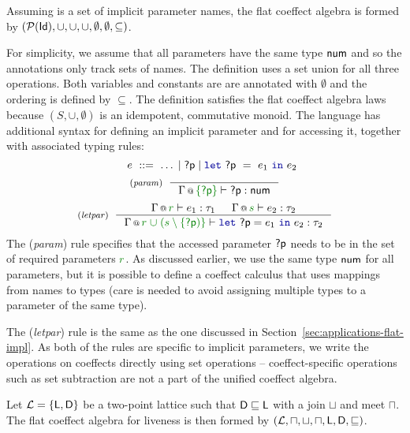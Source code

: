 \begin{example}
Assuming  is a set of implicit parameter names, the flat coeffect algebra
is formed by $(\mathcal{P}(\textnormal{\sffamily Id}), \cup, \cup, \cup, \emptyset, \emptyset, \subseteq)$.
\end{example}

\noindent
For simplicity, we assume that all parameters have the same type $\textnormal{\sffamily num}$ and so the annotations only
track sets of names. The definition uses a set union for all three operations. Both variables and
constants are are annotated with $\emptyset$ and the ordering is defined by $\subseteq$. The
definition satisfies the flat coeffect algebra laws because $(S, \cup, \emptyset)$ is an idempotent,
commutative monoid. The language has additional syntax for defining an implicit parameter and for
accessing it, together with associated typing rules:
%
\begin{equation*}
\quad~ e ~::=~ \ldots \sep \ident{?p} \sep \kvd{let}~\ident{?p}~=~e_1~\kvd{in}~e_2
\end{equation*}
\begin{equation*}
\tyrule{param}
  { ~ }
  { \coctx{\Gamma}{\cclrd{ \{ \ident{?p} \} }} \vdash \ident{?p} : \ident{num} }
\end{equation*}
\begin{equation*}
\tyrule{letpar}
  { \coctx{\Gamma}{\cclrd{r}} \vdash e_1 : \tau_1 &
    \coctx{\Gamma}{\cclrd{s}} \vdash e_2 : \tau_2}
  {\coctx{\Gamma}{\cclrd{r} \;\cclrd{\cup\; (\cclrd{s} \setminus \{ \ident{?p}) \}} } \vdash \kvd{let}~\ident{?p}=e_1~\kvd{in}~e_2 : \tau_2 }
\end{equation*}
%
The (\emph{param}) rule specifies that the accessed parameter $\textnormal{\sffamily ?p}$ needs to be in the set of required
parameters $\cclrd{r}$. As discussed earlier, we use the same type $\textnormal{\sffamily num}$ for all parameters, but
it is possible to define a coeffect calculus that uses mappings from names to types (care is needed to
avoid assigning multiple types to a parameter of the same type).

The (\emph{letpar}) rule is the same as the one discussed in Section~\ref{sec:applications-flat-impl}.
As both of the rules are specific to implicit parameters, we write the operations on coeffects directly
using set operations -- coeffect-specific operations such as set subtraction are not a part of the
unified coeffect algebra.

\begin{example}[Liveness]
Let $\mathcal{L}=\{ \ident{L}, \ident{D} \}$ be a two-point lattice such that $\textnormal{\sffamily D} \sqsubseteq \textnormal{\sffamily L}$
with a join $\sqcup$ and meet $\sqcap$. The flat coeffect algebra for liveness is then formed by
$(\mathcal{L}, \sqcap, \sqcup, \sqcap, \textnormal{\sffamily L}, \textnormal{\sffamily D}, \sqsubseteq)$.
\end{example}

